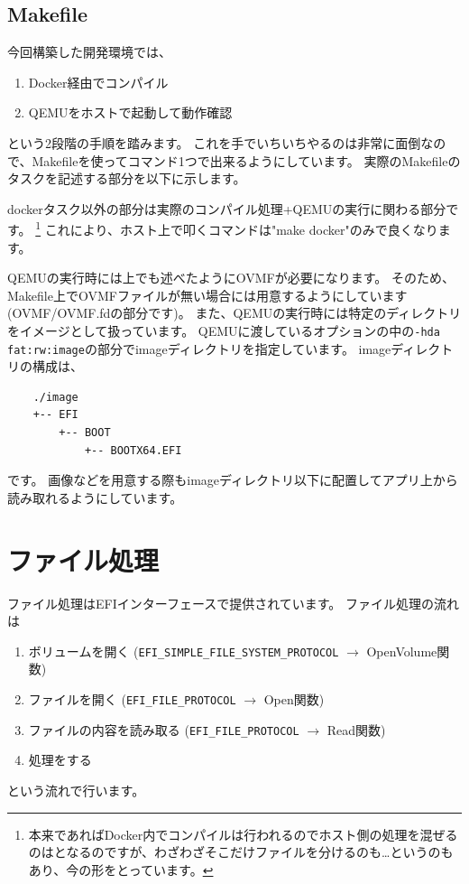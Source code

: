 \documentclass[10pt,b5paper,twoside,openany]{ltjsbook}
\begin{document}
\subsection{Makefile}
今回構築した開発環境では、
\begin{enumerate}
    \item Docker経由でコンパイル
    \item QEMUをホストで起動して動作確認
\end{enumerate}
という2段階の手順を踏みます。
これを手でいちいちやるのは非常に面倒なので、Makefileを使ってコマンド1つで出来るようにしています。
実際のMakefileのタスクを記述する部分を以下に示します。

dockerタスク以外の部分は実際のコンパイル処理+QEMUの実行に関わる部分です。
\footnote{本来であればDocker内でコンパイルは行われるのでホスト側の処理を混ぜるのはとなるのですが、わざわざそこだけファイルを分けるのも…というのもあり、今の形をとっています。}
これにより、ホスト上で叩くコマンドは"make docker"のみで良くなります。

QEMUの実行時には上でも述べたようにOVMFが必要になります。
そのため、Makefile上でOVMFファイルが無い場合には用意するようにしています(OVMF/OVMF.fdの部分です)。
また、QEMUの実行時には特定のディレクトリをイメージとして扱っています。
QEMUに渡しているオプションの中の\verb+-hda fat:rw:image+の部分でimageディレクトリを指定しています。
imageディレクトリの構成は、
{
    \centering
    \begin{verbatim}
    ./image
    +-- EFI
        +-- BOOT
            +-- BOOTX64.EFI
    \end{verbatim}
}
です。
画像などを用意する際もimageディレクトリ以下に配置してアプリ上から読み取れるようにしています。

\section{ファイル処理}
ファイル処理はEFIインターフェースで提供されています。
ファイル処理の流れは
\begin{enumerate}
    \item ボリュームを開く (\verb+EFI_SIMPLE_FILE_SYSTEM_PROTOCOL+ $\rightarrow$ OpenVolume関数)
    \item ファイルを開く (\verb+EFI_FILE_PROTOCOL+ $\rightarrow$ Open関数)
    \item ファイルの内容を読み取る (\verb+EFI_FILE_PROTOCOL+ $\rightarrow$ Read関数)
    \item 処理をする
\end{enumerate}
という流れで行います。
\end{document}
